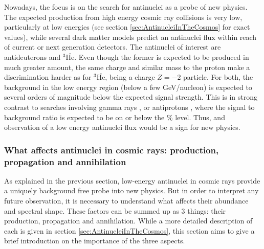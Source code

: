Nowadays, the focus is on the search for antinuclei as a probe of new physics. The expected production from high energy cosmic ray collisions is very low, particularly at low energies (see section \ref{sec:AntinucleiInTheCosmos} for exact values), while several dark matter models predict an antinuclei flux within reach of current or next generation detectors\cite{Doetinchem_2020_review}. The antinuclei of interest are antideuterons and $^3\overline{\mathrm{He}}$. Even though the former is expected to be produced in much greater amount, the same charge and similar mass to the proton make a discrimination harder as for $^3\overline{\mathrm{He}}$, being a charge $Z=-2$ particle. For both, the background in the low energy region (below a few GeV/nucleon) is expected to several orders of magnitude below the expected signal strength. This is in strong contrast to searches involving gamma rays \cite{}, or antiprotons \cite{}, where the signal to background ratio is expected to be on or below the \% level. Thus, and observation of a low energy antinuclei flux would be a sign for new physics. 

\subsubsection{ What affects antinuclei in cosmic rays: production, propagation and annihilation}
As explained in the previous section, low-energy antinuclei in cosmic rays provide a uniquely background free probe into new physics. But in order to interpret any future observation, it is necessary to understand what affects their abundance and spectral shape. These factors can be summed up as 3 things: their production, propagation and annihilation. While a more detailed description of each is given in section \ref{sec:AntinucleiInTheCosmos}, this section aims to give a brief introduction on the importance of the three aspects. \\

